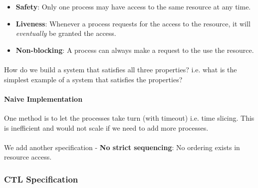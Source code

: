 \documentclass{article}
\theoremstyle{plain}
\theoremstyle{definition}
\begin{document}
\begin{multicols}{2}
\begin{itemize}
\item \textbf{Safety}: Only one process may have access to the same resource at any time.
\item \textbf{Liveness}: Whenever a process requests for the access to the resource, it will \textit{eventually} be granted the access.
\item \textbf{Non-blocking}: A process can always make a request to the use the resource.
\end{itemize}

\paragraph{} How do we build a system that satisfies all three properties? i.e. what is the simplest example of a system that satisfies the properties?

\paragraph{Naive Implementation} One method is to let the processes take turn (with timeout) i.e. time slicing. This is inefficient and would not scale if we need to add more processes. 

\paragraph{} We add another specification - \textbf{No strict sequencing}: No ordering exists in resource access.

\subsubsection{CTL Specification}

\end{multicols}
\end{document}
